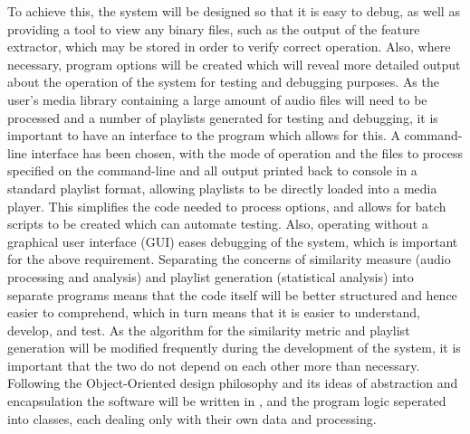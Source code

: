 To achieve this, the system will be designed so that it is easy to debug, as well as providing a tool to view any binary files, such as the output of the feature extractor, which may be stored in order to verify correct operation. Also, where necessary, program options will be created which will reveal more detailed output about the operation of the system for testing and debugging purposes.
\label{text:spec:objective:cli}
As the user's media library containing a large amount of audio files will need to be processed and a number of playlists generated for testing and debugging, it is important to have an interface to the program which allows for this. A command-line interface has been chosen, with the mode of operation and the files to process specified on the command-line and all output printed back to console in a standard playlist format, allowing playlists to be directly loaded into a media player. This simplifies the code needed to process options, and allows for batch scripts to be created which can automate testing. Also, operating without a graphical user interface (GUI) eases debugging of the system, which is important for the above requirement.
Separating the concerns of similarity measure (audio processing and analysis) and playlist generation (statistical analysis) into separate programs means that the code itself will be better structured and hence easier to comprehend, which in turn means that it is easier to understand, develop, and test. As the algorithm for the similarity metric and playlist generation will be modified frequently during the development of the system, it is important that the two do not depend on each other more than necessary. Following the Object-Oriented design philosophy and its ideas of abstraction and encapsulation the software will be written in , and the program logic seperated into classes, each dealing only with their own data and processing.
